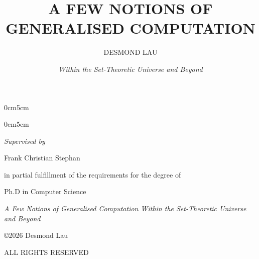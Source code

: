 \documentclass[12pt, twoside]{memoir}
\author{DESMOND LAU}
\title{A FEW NOTIONS OF GENERALISED COMPUTATION}
\date{\textit{Within the Set-Theoretic Universe and Beyond}}
\makeatletter
\numberwithin{equation}{section}
\def\maketitle{%
  \null
  \thispagestyle{empty}%
  \vfill
  \begin{center}\leavevmode
    \normalfont
    {\LARGE \bfseries \raggedleft \@author\par}%
    \hrulefill\par
    {\huge  \raggedright 
    	\begin{changemargin}{0cm}{5cm} \@title
		\end{changemargin}}%
    {\LARGE  \raggedright 
    	\begin{changemargin}{0cm}{5cm} \@date
		\end{changemargin} \par}%
  \end{center}%
  \vfill
  \null
  \cleardoublepage
  }
\theoremstyle{definition}
\theoremstyle{remark}
\theoremstyle{definition}
\theoremstyle{definition}
\theoremstyle{definition}
\theoremstyle{remark}
\newcommand{\blankpage}{
\newpage
\thispagestyle{empty}
\mbox{}
\newpage
}
\makeatother
\begin{document}
\let\cleardoublepage\clearpage


\maketitle


\blankpage

\frontmatter

\clearpage
\thispagestyle{empty}

\null\vfill

\begin{center}
\Large \textit{Supervised by}
\end{center}

\begin{center}
\Large Frank Christian Stephan
\end{center}
\vfill\null

\null\vfill
\begin{center}
\large in partial fulfillment of the requirements for the degree of
\end{center}
\begin{center}
\large Ph.D in Computer Science
\end{center}

\vfill\null

\clearpage

\null\vfill

\begin{flushleft}
\textit{A Few Notions of Generalised Computation Within the Set-Theoretic Universe and Beyond} 

\medskip

\copyright 2026 Desmond Lau

\bigskip





ALL RIGHTS RESERVED

\end{flushleft}
\end{document}
